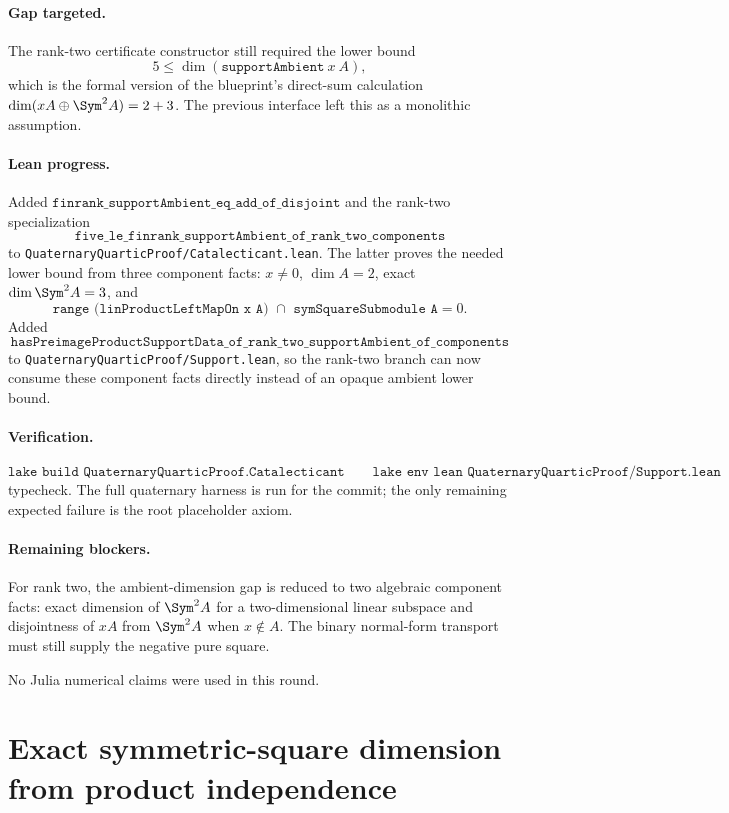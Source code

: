 \documentclass[11pt]{article}
\begin{document}
\paragraph{Gap targeted.}
The rank-two certificate constructor still required the lower bound
\[
5 \le \dim(\texttt{supportAmbient}\ x\ A),
\]
which is the formal version of the blueprint's direct-sum calculation
\(\dim(xA\oplus\Sym^2 A)=2+3\).  The previous interface left this as a
monolithic assumption.

\paragraph{Lean progress.}
Added \(\texttt{finrank\_supportAmbient\_eq\_add\_of\_disjoint}\) and the
rank-two specialization
\[
\texttt{five\_le\_finrank\_supportAmbient\_of\_rank\_two\_components}
\]
to \texttt{QuaternaryQuarticProof/Catalecticant.lean}.  The latter proves the
needed lower bound from three component facts: \(x\ne0\), \(\dim A=2\), exact
\(\dim\Sym^2 A=3\), and
\[
\texttt{range (linProductLeftMapOn x A) }\cap\texttt{ symSquareSubmodule A}
=0.
\]
Added
\[
\texttt{hasPreimageProductSupportData\_of\_rank\_two\_supportAmbient\_of\_components}
\]
to \texttt{QuaternaryQuarticProof/Support.lean}, so the rank-two branch can
now consume these component facts directly instead of an opaque ambient lower
bound.

\paragraph{Verification.}
\[
\texttt{lake build QuaternaryQuarticProof.Catalecticant}
\qquad
\texttt{lake env lean QuaternaryQuarticProof/Support.lean}
\]
typecheck.  The full quaternary harness is run for the commit; the only
remaining expected failure is the root placeholder axiom.

\paragraph{Remaining blockers.}
For rank two, the ambient-dimension gap is reduced to two algebraic component
facts: exact dimension of \(\Sym^2 A\) for a two-dimensional linear subspace
and disjointness of \(xA\) from \(\Sym^2A\) when \(x\notin A\).  The binary
normal-form transport must still supply the negative pure square.

No Julia numerical claims were used in this round.

\section*{Exact symmetric-square dimension from product independence}
\end{document}
